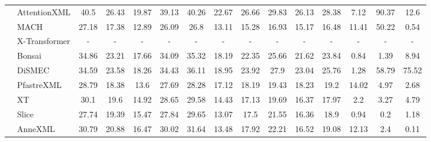 \begin{table*}
{\begin{tabular}{@{}c|l|ccccc|ccccc|ccc@{}}
	& AttentionXML	 & 40.5	 & 26.43	 & 19.87	 & 39.13	 & 40.26	 & 22.67	 & 26.66	 & 29.83	 & 26.13	 & 28.38	 & 7.12	 & 90.37	 & 12.6\\
	& MACH	 & 27.18	 & 17.38	 & 12.89	 & 26.09	 & 26.8	 & 13.11	 & 15.28	 & 16.93	 & 15.17	 & 16.48	 & 11.41	 & 50.22	 & 0.54\\
	& X-Transformer	 & -	 & -	 & -	 & -	 & -	 & -	 & -	 & -	 & -	 & -	 & -	 & -	 & -\\
	& Bonsai	 & 34.86	 & 23.21	 & 17.66	 & 34.09	 & 35.32	 & 18.19	 & 22.35	 & 25.66	 & 21.62	 & 23.84	 & 0.84	 & 1.39	 & 8.94\\
	& DiSMEC	 & 34.59	 & 23.58	 & 18.26	 & 34.43	 & 36.11	 & 18.95	 & 23.92	 & 27.9	 & 23.04	 & 25.76	 & 1.28	 & 58.79	 & 75.52\\
	& PfastreXML	 & 28.79	 & 18.38	 & 13.6	 & 27.69	 & 28.28	 & 17.12	 & 18.19	 & 19.43	 & 18.23	 & 19.2	 & 14.02	 & 4.97	 & 2.68\\
	& XT	 & 30.1	 & 19.6	 & 14.92	 & 28.65	 & 29.58	 & 14.43	 & 17.13	 & 19.69	 & 16.37	 & 17.97	 & 2.2	 & 3.27	 & 4.79\\
	& Slice	 & 27.74	 & 19.39	 & 15.47	 & 27.84	 & 29.65	 & 13.07	 & 17.5	 & 21.55	 & 16.36	 & 18.9	 & 0.94	 & 0.2	 & 1.18\\
	& AnneXML	 & 30.79	 & 20.88	 & 16.47	 & 30.02	 & 31.64	 & 13.48	 & 17.92	 & 22.21	 & 16.52	 & 19.08	 & 12.13	 & 2.4	 & 0.11\\
    \bottomrule
    \end{tabular}
    }
\end{table*}

